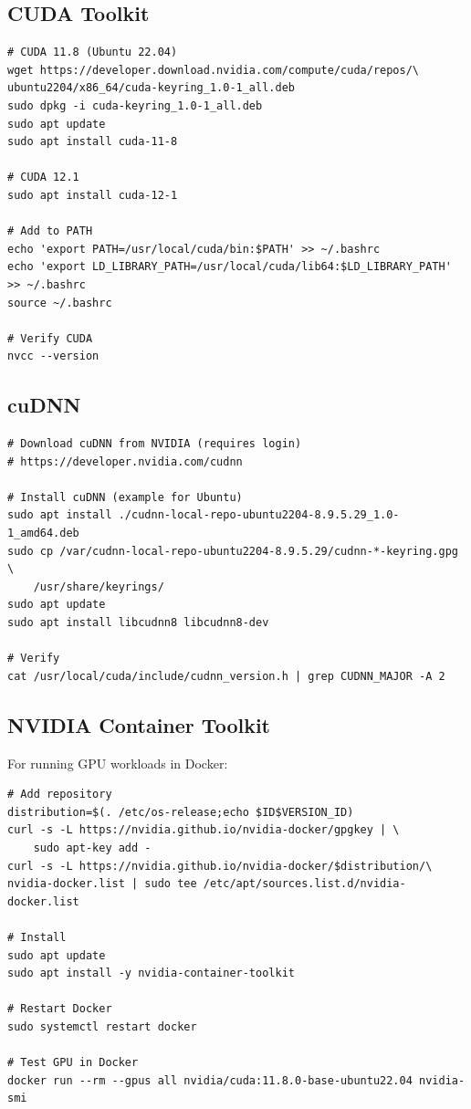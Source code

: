 \subsection{CUDA Toolkit}

\begin{lstlisting}[style=shell]
# CUDA 11.8 (Ubuntu 22.04)
wget https://developer.download.nvidia.com/compute/cuda/repos/\
ubuntu2204/x86_64/cuda-keyring_1.0-1_all.deb
sudo dpkg -i cuda-keyring_1.0-1_all.deb
sudo apt update
sudo apt install cuda-11-8

# CUDA 12.1
sudo apt install cuda-12-1

# Add to PATH
echo 'export PATH=/usr/local/cuda/bin:$PATH' >> ~/.bashrc
echo 'export LD_LIBRARY_PATH=/usr/local/cuda/lib64:$LD_LIBRARY_PATH' >> ~/.bashrc
source ~/.bashrc

# Verify CUDA
nvcc --version
\end{lstlisting}

\subsection{cuDNN}

\begin{lstlisting}[style=shell]
# Download cuDNN from NVIDIA (requires login)
# https://developer.nvidia.com/cudnn

# Install cuDNN (example for Ubuntu)
sudo apt install ./cudnn-local-repo-ubuntu2204-8.9.5.29_1.0-1_amd64.deb
sudo cp /var/cudnn-local-repo-ubuntu2204-8.9.5.29/cudnn-*-keyring.gpg \
    /usr/share/keyrings/
sudo apt update
sudo apt install libcudnn8 libcudnn8-dev

# Verify
cat /usr/local/cuda/include/cudnn_version.h | grep CUDNN_MAJOR -A 2
\end{lstlisting}

\subsection{NVIDIA Container Toolkit}

For running GPU workloads in Docker:

\begin{lstlisting}[style=shell]
# Add repository
distribution=$(. /etc/os-release;echo $ID$VERSION_ID)
curl -s -L https://nvidia.github.io/nvidia-docker/gpgkey | \
    sudo apt-key add -
curl -s -L https://nvidia.github.io/nvidia-docker/$distribution/\
nvidia-docker.list | sudo tee /etc/apt/sources.list.d/nvidia-docker.list

# Install
sudo apt update
sudo apt install -y nvidia-container-toolkit

# Restart Docker
sudo systemctl restart docker

# Test GPU in Docker
docker run --rm --gpus all nvidia/cuda:11.8.0-base-ubuntu22.04 nvidia-smi
\end{lstlisting}

